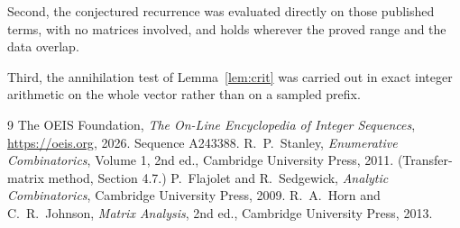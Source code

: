 \documentclass[11pt,a4paper]{article}
\theoremstyle{plain}
\theoremstyle{definition}
\begin{document}
Second, the conjectured recurrence was evaluated directly on those published terms, with no
matrices involved, and holds wherever the proved range and the data overlap.

Third, the annihilation test of Lemma~\ref{lem:crit} was carried out in exact integer
arithmetic on the whole vector rather than on a sampled prefix.

\begin{thebibliography}{9}
 The OEIS Foundation, \emph{The On-Line Encyclopedia of Integer
Sequences}, \url{https://oeis.org}, 2026. Sequence A243388.
 R.~P.~Stanley, \emph{Enumerative Combinatorics}, Volume 1, 2nd ed.,
Cambridge University Press, 2011. (Transfer-matrix method, Section 4.7.)
 P.~Flajolet and R.~Sedgewick, \emph{Analytic Combinatorics}, Cambridge
University Press, 2009.
 R.~A.~Horn and C.~R.~Johnson, \emph{Matrix Analysis}, 2nd ed., Cambridge
University Press, 2013.
\end{thebibliography}
\end{document}
